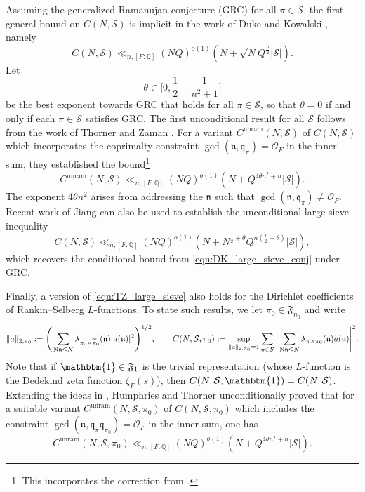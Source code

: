 \documentclass[11pt]{amsart}
\theoremstyle{remark}
\numberwithin{equation}{section}
\newcommand{\kn}{\mathfrak{n}}
\newcommand{\kq}{\mathfrak{q}}
\newcommand{\N}{\textnormal{N}}
\newcommand{\Q}{\mathbb{Q}}
\newcommand{\mS}{\mathcal{S}}
\begin{document}
Assuming the generalized Ramanujan conjecture (GRC) for all $\pi\in\mathcal{S}$, the first general bound on $C(N,\mathcal{S})$ is implicit in the work of Duke and Kowalski \cite[Section 4]{DK}, namely
\begin{equation} \label{eqn:DK_large_sieve_conj}
C(N,\mathcal{S})\ll_{n,[F:\Q]}(NQ)^{o(1)}(N+\sqrt{N}Q^{\frac{n}{2}}|\mathcal{S}|).
\end{equation}
Let
\[
\theta\in\Big[0,\frac{1}{2}-\frac{1}{n^2+1}\Big]
\]
be the best exponent towards GRC that holds for all $\pi\in\mathcal{S}$, so that $\theta=0$ if and only if each $\pi\in\mathcal{S}$ satisfies GRC. The first unconditional result for all $\mS$ follows from the work of Thorner and Zaman \cite{TZ_GLn}.  For a variant $C^{\mathrm{unram}}(N, \mS)$ of $C(N, \mS)$ which incorporates the coprimalty constraint $\gcd(\kn, \kq_{\pi}) = \mathcal{O}_F$ in the inner sum, they established the bound\footnote{This incorporates the correction from \cite[Section 4]{humphries2024zeros}.}
\begin{equation}
\label{eqn:TZ_large_sieve}
C^{\mathrm{unram}}(N, \mS) \ll_{n,[F:\Q]} (NQ)^{o(1)}(N+Q^{4\theta n^2+n}|\mathcal{S}|).
\end{equation}
The exponent $4\theta n^2$ arises from addressing the $\kn$ such that $\gcd(\kn,\kq_{\pi})\neq\mathcal{O}_F$. Recent work of Jiang \cite{Jiang} can also be used to establish the unconditional large sieve inequality
\begin{equation} \label{eqn:Jiang_large_sieve}
C(N,\mathcal{S})\ll_{n,[F:\Q]} (NQ)^{o(1)}(N+N^{\frac{1}{2}+\theta}Q^{n(\frac{1}{2}-\theta)}|\mathcal{S}|),
\end{equation}
which recovers the conditional bound from \eqref{eqn:DK_large_sieve_conj} under GRC.

Finally, a version of \eqref{eqn:TZ_large_sieve} also holds for the Dirichlet coefficients of Rankin--Selberg $L$-functions.  To state such results, we let $\pi_0\in\mathfrak{F}_{n_0}$ and write
\begin{equation*}
\begin{gathered}
\|a\|_{2,\pi_0}:=\Bigg(\sum_{\N\kn\leq N}\lambda_{\pi_0\times\widetilde{\pi}_0}(\kn)|a(\kn)|^2\Bigg)^{1/2}, \qquad 
C(N,\mathcal{S},\pi_0):=\sup_{\|a\|_{2,\pi_0}=1}\sum_{\pi\in\mathcal{S}}\Bigg|\sum_{\N\kn\leq N}\lambda_{\pi\times\pi_0}(\kn)a(\kn)\Bigg|^2.
\end{gathered}
\end{equation*}
Note that if $\mathbbm{1}\in\mathfrak{F}_1$ is the trivial representation (whose $L$-function is the Dedekind zeta function $\zeta_F(s)$), then $C(N,\mathcal{S},\mathbbm{1})=C(N,\mathcal{S})$. Extending the ideas in \cite{TZ_GLn}, Humphries and Thorner \cite{humphries2024zeros} unconditionally proved that for a suitable variant $C^{\mathrm{unram}}(N, \mS, \pi_0)$ of $C(N, \mS, \pi_0)$ which includes the constraint $\gcd(\kn,\kq_{\pi}\kq_{\pi_0})=\mathcal{O}_F$ in the inner sum, one has
\begin{equation}
\label{eqn:HT_large_sieve}
C^{\mathrm{unram}}(N, \mS, \pi_0) \ll_{n,[F:\Q]} (NQ)^{o(1)}(N+Q^{4\theta n^2+n}|\mathcal{S}|).
\end{equation}
\end{document}
